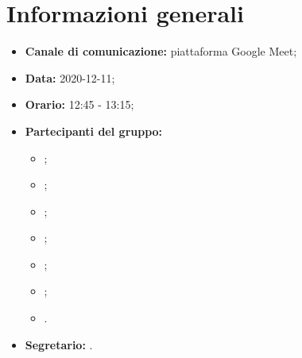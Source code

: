 \section{Informazioni generali}
\begin{itemize}
\item \textbf{Canale di comunicazione:} piattaforma Google Meet;
\item \textbf{Data:} 2020-12-11;
\item \textbf{Orario:} 12:45 - 13:15;
\item \textbf{Partecipanti del gruppo:}
	\begin{itemize}
	\item \MDI ;
	\item \MB ;
	\item \SB ;
	\item \GB ;
	\item \NM ;
	\item \FD ;
	\item \VAS .
	\end{itemize}
\item \textbf{Segretario:} \GB .

\end{itemize}